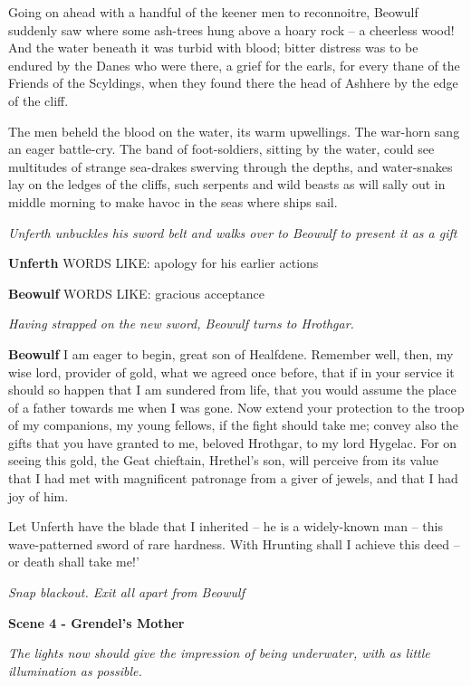 \documentclass[a4paper]{article}
\begin{document}
{Going on ahead with a handful of the
keener men to reconnoitre,
Beowulf suddenly saw where some ash-trees
hung above a hoary rock
– a cheerless wood! And the water beneath it
was turbid with blood; bitter distress
was to be endured by the Danes who were there,
a grief for the earls, for every thane
of the Friends of the Scyldings, when they found there
the head of Ashhere by the edge of the cliff.

The men beheld the blood on the water,
its warm upwellings. The war-horn sang
an eager battle-cry. The band of foot-soldiers,
sitting by the water, could see multitudes
of strange sea-drakes swerving through the depths,
and water-snakes lay on the ledges of the cliffs,
such serpents and wild beasts as will sally out
in middle morning to make havoc
in the seas where ships sail.

\centerline{\textit{Unferth unbuckles his sword belt and walks over to Beowulf to present it as a gift}}

\textbf{Unferth} WORDS LIKE: apology for his earlier actions

\textbf{Beowulf} WORDS LIKE: gracious acceptance

\centerline{\textit{Having strapped on the new sword, Beowulf turns to Hrothgar.}}

\textbf{Beowulf} I am eager to begin, great son of Healfdene.
Remember well, then, my wise lord,
provider of gold, what we agreed once before,
that if in your service it should so happen
that I am sundered from life, that you would assume the place
of a father towards me when I was gone.
Now extend your protection to the troop of my companions,
my young fellows, if the fight should take me;
convey also the gifts that you have granted to me,
beloved Hrothgar, to my lord Hygelac.
For on seeing this gold, the Geat chieftain,
Hrethel’s son, will perceive from its value
that I had met with magnificent patronage
from a giver of jewels, and that I had joy of him.

Let Unferth have the blade that I inherited
– he is a widely-known man – this wave-patterned sword
of rare hardness. With Hrunting shall I
achieve this deed – or death shall take me!’

\centerline{\textit{Snap blackout. Exit all apart from Beowulf}}

\centerline{\textbf{Scene 4 - Grendel's Mother}}

\centerline{\textit{The lights now should give the impression of being underwater, with as little illumination as possible.}}

}
\end{document}

